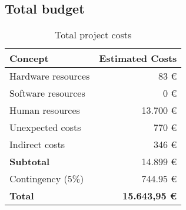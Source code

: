 \subsection{Total budget}
\begin{frame}{\insertsubsec}
  \begin{table}[H]
    \centering
    \begin{tabular}{|l|r|}
      \hline
      \textbf{Concept} & \textbf{Estimated Costs} \\ \hline\hline
  
      Hardware resources & 83 \euro \\ \hline
      Software resources & 0 \euro \\ \hline
      Human resources & 13.700 \euro \\ \hline
      Unexpected costs & 770 \euro \\ \hline
      Indirect costs & 346 \euro \\ \hline
  
      \hline\hline
      \textbf{Subtotal} & 14.899 \euro \\
      \hline\hline
      Contingency (5\%) & 744.95 \euro \\
      \hline\hline
      \textbf{Total} & \textbf{15.643,95 \euro} \\ \hline
    \end{tabular}
  
    \caption{Total project costs \label{tab:total-costs}}
  \end{table}
\end{frame}

